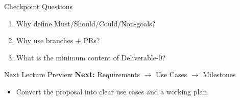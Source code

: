 \documentclass{beamer}
\begin{document}
\begin{frame}{Checkpoint Questions}
  \begin{enumerate}[<+->]
    \item Why define Must/Should/Could/Non-goals?
    \item Why use branches + PRs?
    \item What is the minimum content of Deliverable-0?
  \end{enumerate}
  \slidesources{\OOPSUnitVISources}
\end{frame}

\begin{frame}{Next Lecture Preview}
  \textbf{Next:} Requirements $\rightarrow$ Use Cases $\rightarrow$ Milestones
  \vspace{0.6em}
  \begin{itemize}[<+->]
    \item Convert the proposal into clear use cases and a working plan.
  \end{itemize}
  \slidesources{\OOPSUnitVISources}
\end{frame}
\end{document}
